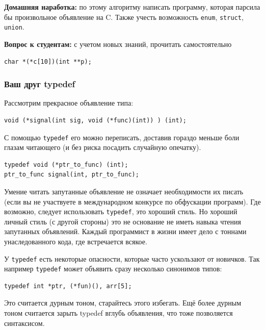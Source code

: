 \documentclass[a4paper,12pt,oneside]{article}
\newif\ifanswers
\begin{document}
\textbf{Домашняя наработка:} по этому алгоритму написать программу, которая парсила бы произвольное объявление на C. Также учесть возможность \lstinline!enum!, \lstinline!struct!, \lstinline!union!.

\textbf{Вопрос к студентам:} с учетом новых знаний, прочитать самостоятельно

\begin{lstlisting}
char *(*c[10])(int **p);
\end{lstlisting}

\ifanswers
Ответ: c is array of 10 pointers to functions, accepting pointer to pointer to int and returning pointer to char.
\fi

\subsubsection{Ваш друг typedef}\label{FriendTypedef}

Рассмотрим прекрасное объявление типа:

\begin{lstlisting}
void (*signal(int sig, void (*func)(int)) ) (int);
\end{lstlisting}

С помощью \lstinline!typedef! его можно переписать, доставив гораздо меньше боли глазам читающего (и без риска посадить случайную опечатку).

\begin{lstlisting}
typedef void (*ptr_to_func) (int);
ptr_to_func signal(int, ptr_to_func);
\end{lstlisting}

Умение читать запутанные объявление не означает необходимости их писать (если вы не участвуете в международном конкурсе по обфускации программ). Где возможно, следует использовать \lstinline!typedef!, это хороший стиль. Но хороший личный стиль (с другой стороны) это не основание не иметь навыка чтения запутанных объявлений. Каждый программист в жизни имеет дело с тоннами унаследованного кода, где встречается всякое.

У \lstinline!typedef! есть некоторые опасности, которые часто ускользают от новичков. Так например \lstinline!typedef! может объявить сразу несколько синонимов типов:

\begin{lstlisting}
typedef int *ptr, (*fun)(), arr[5];
\end{lstlisting}

Это считается дурным тоном, старайтесь этого избегать. Ещё более дурным тоном считается зарыть typedef вглубь объявления, что тоже позволяется синтаксисом.
\end{document}
